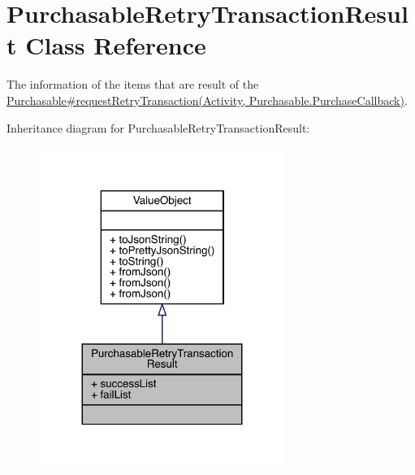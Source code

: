 \hypertarget{classcom_1_1toast_1_1android_1_1gamebase_1_1base_1_1purchase_1_1_purchasable_retry_transaction_result}{}\section{Purchasable\+Retry\+Transaction\+Result Class Reference}
\label{classcom_1_1toast_1_1android_1_1gamebase_1_1base_1_1purchase_1_1_purchasable_retry_transaction_result}


The information of the items that are result of the \hyperlink{}{Purchasable\#request\+Retry\+Transaction(\+Activity, Purchasable.\+Purchase\+Callback)}.  




Inheritance diagram for Purchasable\+Retry\+Transaction\+Result\+:\nopagebreak
\begin{figure}[H]
\begin{center}
\leavevmode
\includegraphics[width=227pt]{classcom_1_1toast_1_1android_1_1gamebase_1_1base_1_1purchase_1_1_purchasable_retry_transaction_result__inherit__graph}
\end{center}
\end{figure}


